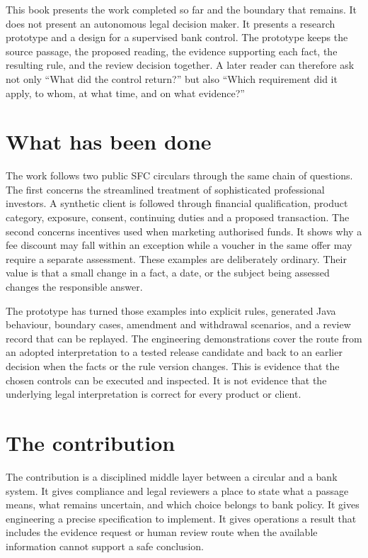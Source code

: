 \documentclass[12pt,a4paper,oneside,openany]{book}
\begin{document}
This book presents the work completed so far and the boundary that remains. It
does not present an autonomous legal decision maker. It presents a research
prototype and a design for a supervised bank control. The prototype keeps the
source passage, the proposed reading, the evidence supporting each fact, the
resulting rule, and the review decision together. A later reader can therefore
ask not only ``What did the control return?'' but also ``Which requirement did
it apply, to whom, at what time, and on what evidence?''

\section*{What has been done}

The work follows two public SFC circulars through the same chain of questions.
The first concerns the streamlined treatment of sophisticated professional
investors. A synthetic client is followed through financial qualification,
product category, exposure, consent, continuing duties and a proposed
transaction. The second concerns incentives used when marketing authorised
funds. It shows why a fee discount may fall within an exception while a voucher
in the same offer may require a separate assessment. These examples are
deliberately ordinary. Their value is that a small change in a fact, a date, or
the subject being assessed changes the responsible answer.

The prototype has turned those examples into explicit rules, generated Java
behaviour, boundary cases, amendment and withdrawal scenarios, and a review
record that can be replayed. The engineering demonstrations cover the route from
an adopted interpretation to a tested release candidate and back to an earlier
decision when the facts or the rule version changes. This is evidence that the
chosen controls can be executed and inspected. It is not evidence that the
underlying legal interpretation is correct for every product or client.

\section*{The contribution}

The contribution is a disciplined middle layer between a circular and a bank
system. It gives compliance and legal reviewers a place to state what a passage
means, what remains uncertain, and which choice belongs to bank policy. It gives
engineering a precise specification to implement. It gives operations a result
that includes the evidence request or human review route when the available
information cannot support a safe conclusion.
\end{document}
